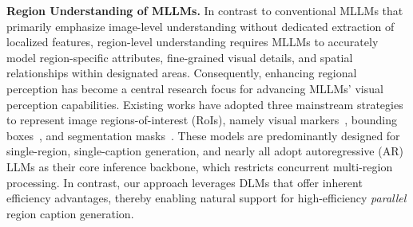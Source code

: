 \noindent
\textbf{Region Understanding of MLLMs.}
In contrast to conventional MLLMs that primarily emphasize image-level understanding without dedicated extraction of localized features, region-level understanding requires MLLMs to accurately model region-specific attributes, fine-grained visual details, and spatial relationships within designated areas. 
%
Consequently, enhancing regional perception has become a central research focus for advancing MLLMs' visual perception capabilities.
%
Existing works have adopted three mainstream strategies to represent image regions-of-interest (RoIs), namely visual markers~\citep{yang2023set}, bounding boxes~\citep{zhang2307gpt4roi, chen2023shikra, rasheed2024glamm}, and segmentation masks~\citep{zhang2024omg,yuan2025sa2va, zhang2025pixel,yuan2025visual,wang2025grasp, zhou2026samtok, lian2025describe}.
%
These models are predominantly designed for single-region, single-caption generation, and nearly all adopt autoregressive (AR) LLMs as their core inference backbone, which restricts concurrent multi-region processing.
%
In contrast, our approach leverages DLMs that offer inherent efficiency advantages, thereby enabling natural support for high-efficiency \textit{parallel} region caption generation.